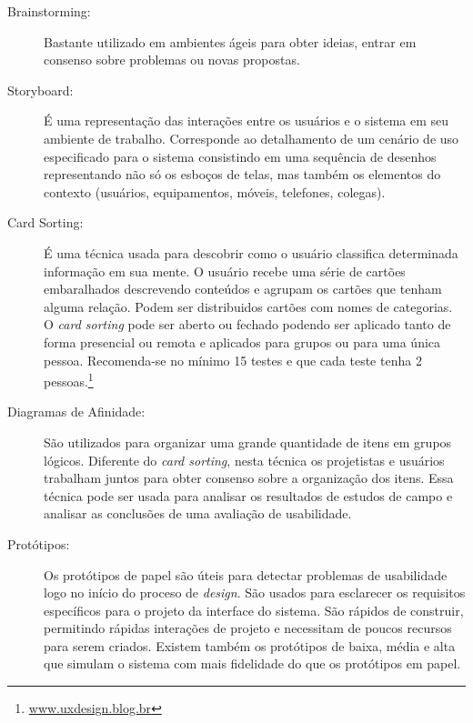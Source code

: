\begin{description}

\item[Brainstorming:]

	Bastante utilizado em ambientes ágeis para obter ideias, entrar em consenso sobre problemas ou novas propostas.

\item[Storyboard:]

É uma representação das interações entre os usuários e o sistema em seu ambiente de trabalho. Corresponde ao detalhamento de um cenário de uso especificado para o sistema consistindo em uma sequência de desenhos representando não só os esboços de telas, mas também os elementos do contexto (usuários, equipamentos, móveis, telefones, colegas).

\item[Card Sorting:]

	É uma técnica usada para descobrir como o usuário classifica determinada informação em sua mente. O usuário recebe uma série de cartões embaralhados descrevendo conteúdos e agrupam os cartões que tenham alguma relação. Podem ser distribuidos cartões com nomes de categorias. 
%
O \textit{card sorting} pode ser aberto ou fechado podendo ser aplicado tanto de forma presencial ou remota e aplicados para grupos ou para uma única pessoa. Recomenda-se no mínimo 15 testes e que cada teste tenha 2 pessoas.\footnote{\url{www.uxdesign.blog.br}}
	
\item[Diagramas de Afinidade:]

	São utilizados para organizar uma grande quantidade de itens em grupos lógicos. Diferente do \textit{card sorting}, nesta técnica os projetistas e usuários trabalham juntos para obter consenso sobre a organização dos itens. Essa técnica pode ser usada para analisar os resultados de estudos de campo e analisar as conclusões de uma avaliação de usabilidade.

\item[Protótipos:]

	Os protótipos de papel são úteis para detectar problemas de usabilidade logo no início do proceso de \emph{design}. São usados para esclarecer os requisitos específicos para o projeto da interface do sistema. São rápidos de construir, permitindo rápidas interações de projeto e necessitam de poucos recursos para serem criados. 
	Existem também os protótipos de baixa, média e alta que simulam o sistema com mais fidelidade do que os protótipos em papel. 
\end{description}

